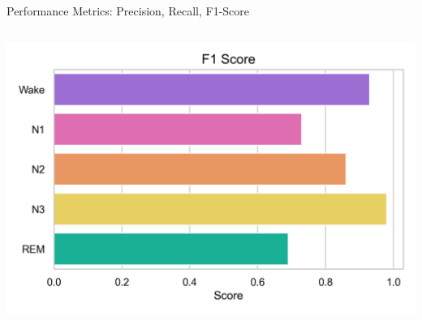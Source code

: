 \begin{frame}{Performance Metrics: Precision, Recall, F1-Score}
\begin{columns}
        \centering
        \includegraphics[width=\linewidth]{images/paper_3/f1_score_plot.png} %
    \end{columns}

\end{frame}

